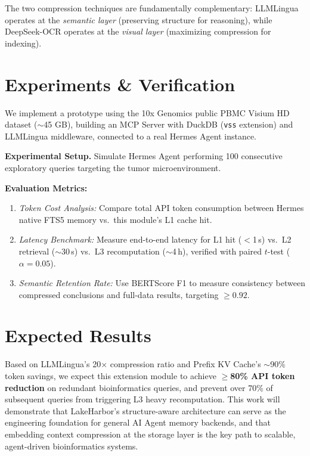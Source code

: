 \documentclass[sigconf]{acmart}
\begin{document}
The two compression techniques are fundamentally complementary: LLMLingua operates at the \textit{semantic layer} (preserving structure for reasoning), while DeepSeek-OCR operates at the \textit{visual layer} (maximizing compression for indexing).

\section{Experiments \& Verification}

We implement a prototype using the 10x Genomics public PBMC Visium HD dataset ($\sim$45 GB), building an MCP Server with DuckDB (\texttt{vss} extension) and LLMLingua middleware, connected to a real Hermes Agent instance.

\textbf{Experimental Setup.} Simulate Hermes Agent performing 100 consecutive exploratory queries targeting the tumor microenvironment.

\textbf{Evaluation Metrics:}
\begin{enumerate}
  \item \textit{Token Cost Analysis:} Compare total API token consumption between Hermes native FTS5 memory vs.\ this module's L1 cache hit.
  \item \textit{Latency Benchmark:} Measure end-to-end latency for L1 hit ($<$1\,s) vs.\ L2 retrieval ($\sim$30\,s) vs.\ L3 recomputation ($\sim$4\,h), verified with paired $t$-test ($\alpha = 0.05$).
  \item \textit{Semantic Retention Rate:} Use BERTScore F1 to measure consistency between compressed conclusions and full-data results, targeting $\geq 0.92$.
\end{enumerate}

\section{Expected Results}

Based on LLMLingua's 20$\times$ compression ratio and Prefix KV Cache's $\sim$90\% token savings, we expect this extension module to achieve \textbf{$\geq$80\% API token reduction} on redundant bioinformatics queries, and prevent over 70\% of subsequent queries from triggering L3 heavy recomputation. This work will demonstrate that LakeHarbor's structure-aware architecture can serve as the engineering foundation for general AI Agent memory backends, and that embedding context compression at the storage layer is the key path to scalable, agent-driven bioinformatics systems.
\end{document}
